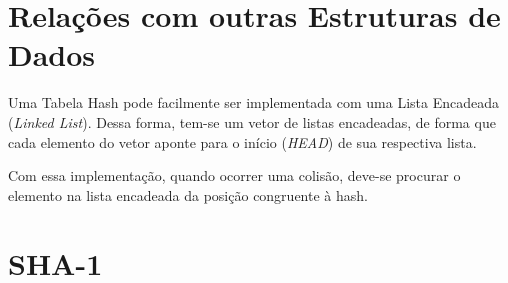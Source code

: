\documentclass[12pt,openright,oneside,a4paper,english,brazil]{abntex2}
\begin{document}
\section*{Relações com outras Estruturas de Dados}
    Uma Tabela Hash pode facilmente ser implementada com uma Lista Encadeada (\textit{Linked List}). Dessa forma, tem-se um vetor de listas encadeadas, de forma que cada elemento do vetor aponte para o início (\textit{HEAD}) de sua respectiva lista.

    Com essa implementação, quando ocorrer uma colisão, deve-se procurar o elemento na lista encadeada da posição congruente à hash.

\section*{SHA-1}
\end{document}
